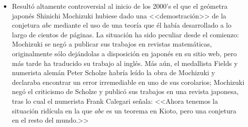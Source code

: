 \documentclass[11pt, reqno]{amsart}
\begin{document}
\begin{itemize}
	\item Resultó altamente controversial al inicio de los 2000's el que el geómetra japonés Shinichi Mochizuki hubiese dado una <<demostración>>
		de la conjetura $abc$ mediante el uso de una teoría que él había desarrollado a lo largo de cientos de páginas.
		La situación ha sido peculiar desde el comienzo: Mochizuki se negó a publicar sus trabajos en revistas matemáticas, originalmente sólo dejándolas
		a disposición en japonés en su sitio web, pero más tarde ha traducido su trabajo al inglés.
		Más aún, el medallista Fields y numerista alemán Peter Scholze habría leído la obra de Mochizuki y declaraba encontrar un error irremediable
		en uno de sus corolarios; Mochizuki negó el criticismo de Scholze y publicó sus trabajos en una revista japonesa, tras lo cual el numerista
		Frank Calegari señala: <<Ahora tenemos la situación ridícula en la que $abc$ es un teorema en Kioto, pero una conjetura en el resto del mundo.>>
\end{itemize}

\nocite{granville:masterclass}
\printbibliography[title={Referencias y lecturas adicionales}]
\end{document}
